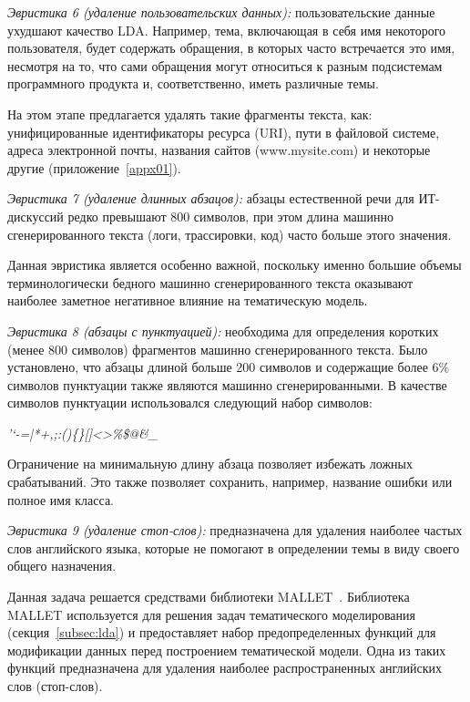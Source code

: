 \textit{Эвристика 6 (удаление пользовательских данных):} пользовательские данные ухудшают качество LDA. Например, тема, включающая в себя имя некоторого пользователя, будет содержать обращения, в которых часто встречается это имя, несмотря на то, что сами обращения могут относиться к разным подсистемам программного продукта и, соответственно, иметь различные темы. 

На этом этапе предлагается удалять такие фрагменты текста, как: унифицированные идентификаторы ресурса (URI), пути в файловой системе, адреса электронной почты, названия сайтов (www.mysite.com) и некоторые другие (приложение~\ref{appx01}).


\textit{Эвристика 7 (удаление длинных абзацов):} абзацы естественной речи для ИТ-дискуссий редко превышают 800 символов, при этом длина машинно сгенерированного текста (логи, трассировки, код) часто больше этого значения.

Данная эвристика является особенно важной, поскольку именно большие объемы терминологически бедного машинно сгенерированного текста оказывают наиболее заметное негативное влияние на тематическую модель.

\textit{Эвристика 8 (абзацы с пунктуацией):} необходима для определения коротких (менее 800 символов) фрагментов машинно сгенерированного текста. Было установлено, что абзацы длиной больше 200 символов и содержащие более 6\% символов пунктуации также являются машинно сгенерированными. В качестве символов пунктуации использовался следующий набор символов:

\vspace{\baselineskip}
\noindent \textit{'`-=|\/*+,;:()\{\}[]<>\%\$@\&\_}
\vspace{\baselineskip}

Ограничение на минимальную длину абзаца позволяет избежать ложных срабатываний. Это также позволяет сохранить, например, название ошибки или полное имя класса.

\textit{Эвристика 9 (удаление стоп-слов):} предназначена для удаления наиболее частых слов английского языка, которые не помогают в определении темы в виду своего общего назначения. 

Данная задача решается средствами библиотеки MALLET~\cite{MALLET}. Библиотека MALLET используется для решения задач тематического моделирования (секция~\ref{subsec:lda}) и предоставляет набор предопределенных функций для модификации данных перед построением тематической модели. Одна из таких функций предназначена для удаления наиболее распространенных английских слов (стоп-слов).

